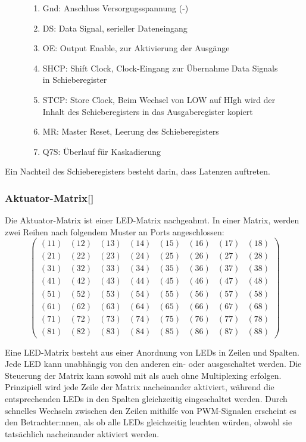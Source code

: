 \begin{figure}[htbp]
\begin{minipage}{0.55\textwidth}
\begin{enumerate}
		\item Gnd: Anschluss Versorgugsspannung (-)
		\item DS: Data Signal, serieller Dateneingang
		\item OE: Output Enable, zur Aktivierung der Ausgänge
		\item SHCP: Shift Clock, Clock-Eingang zur Übernahme Data Signals in Schieberegister
		\item STCP: Store Clock, Beim Wechsel von LOW auf HIgh wird der Inhalt des Schieberegisters in das Ausgaberegister kopiert %
		\item MR: Master Reset, Leerung des Schieberegisters
		\item Q7S: Überlauf für Kaskadierung
	\end{enumerate}
\end{minipage}
\end{figure}
Ein Nachteil des Schieberegisters besteht darin, dass Latenzen auftreten.
\subsubsection{Aktuator-Matrix[\cite*[siehe ][]{LEDMatrix}]}
Die Aktuator-Matrix ist einer LED-Matrix nachgeahmt.
In einer Matrix, werden zwei Reihen nach folgendem Muster an Ports angeschlossen:
$$
\begin{pmatrix}
	(11) & (12) & (13) & (14) & (15) & (16) & (17) & (18) \\
	(21) & (22) & (23) & (24) & (25) & (26) & (27) & (28) \\
	(31) & (32) & (33) & (34) & (35) & (36) & (37) & (38) \\
	(41) & (42) & (43) & (44) & (45) & (46) & (47) & (48) \\
	(51) & (52) & (53) & (54) & (55) & (56) & (57) & (58) \\
	(61) & (62) & (63) & (64) & (65) & (66) & (67) & (68) \\
	(71) & (72) & (73) & (74) & (75) & (76) & (77) & (78) \\
	(81) & (82) & (83) & (84) & (85) & (86) & (87) & (88)
\end{pmatrix}
$$

Eine LED-Matrix besteht aus einer Anordnung von LEDs in Zeilen und Spalten.
Jede LED kann unabhängig von den anderen ein- oder ausgeschaltet werden.
Die Steuerung der Matrix kann sowohl mit als auch ohne Multiplexing erfolgen.
Prinzipiell wird jede Zeile der Matrix nacheinander aktiviert, während die
entsprechenden LEDs in den Spalten gleichzeitig eingeschaltet werden.
Durch schnelles Wechseln zwischen den Zeilen mithilfe von \ac{PWM}-Signalen erscheint es den Betrachter:nnen, als ob alle LEDs
gleichzeitig leuchten würden, obwohl sie tatsächlich nacheinander aktiviert werden.


